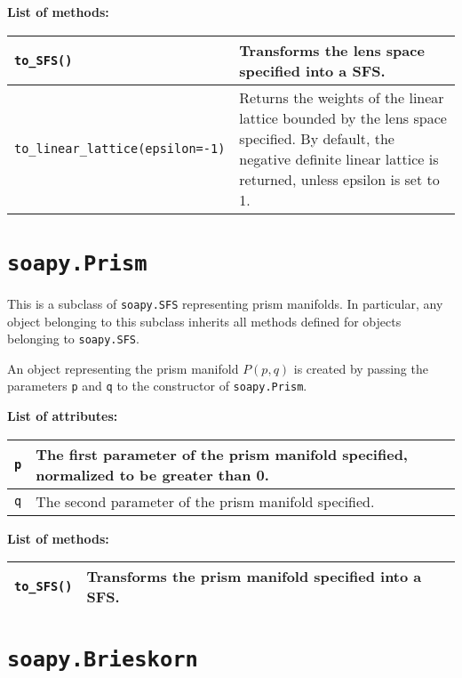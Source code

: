 \documentclass[12pt]{amsart}
\theoremstyle{definition}
\theoremstyle{remark}
\numberwithin{equation}{section}
\begin{document}
\textbf{List of methods:}

\renewcommand{\arraystretch}{1.5}%
\begin{tabularx}{\linewidth}{X X}\\
\hline
\texttt{to\_SFS()} & Transforms the lens space specified into a SFS.\\
\hline
\texttt{to\_linear\_lattice(epsilon=-1)} & Returns the weights of the linear lattice bounded by the lens space specified. By default, the negative definite linear lattice is returned, unless epsilon is set to 1.\\
\hline
\end{tabularx}

\newpage

\section*{\texttt{soapy.Prism}}

This is a subclass of \texttt{soapy.SFS} representing prism manifolds.
In particular, any object belonging to this subclass inherits all methods defined for objects belonging to \texttt{soapy.SFS}.

An object representing the prism manifold $P(p,q)$ is created by passing the parameters \texttt{p} and \texttt{q} to the constructor of \texttt{soapy.Prism}.

\bigskip

\textbf{List of attributes:}

\renewcommand{\arraystretch}{1.5}%
\begin{tabularx}{\linewidth}{X X}
\hline
\texttt{p} & The first parameter of the prism manifold specified, normalized to be greater than 0.\\
\hline
\texttt{q} & The second parameter of the prism manifold specified.\\
\hline
\end{tabularx}

\textbf{List of methods:}

\renewcommand{\arraystretch}{1.5}%
\begin{tabularx}{\linewidth}{X X}
\hline
\texttt{to\_SFS()} & Transforms the prism manifold specified into a SFS. \phantom{aaaaaaaaaaaaaaaaaaaa}\\
\hline
\end{tabularx}

\section*{\texttt{soapy.Brieskorn}}
\end{document}

